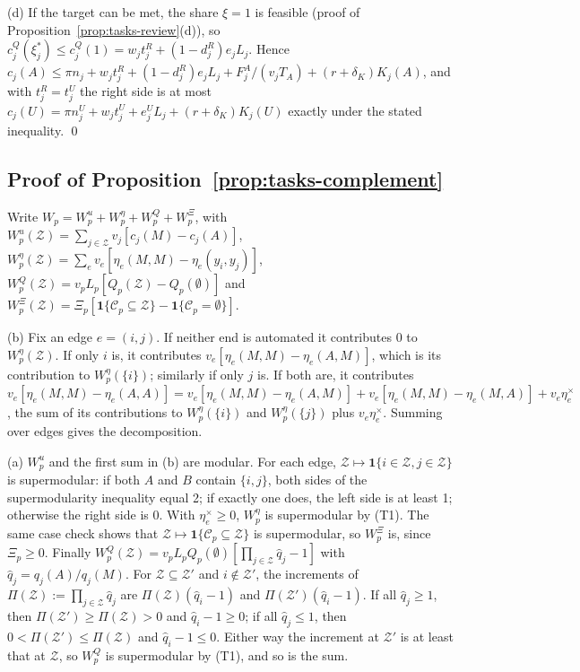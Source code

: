 (d) If the target can be met, the share $\xi=1$ is feasible (proof of Proposition~\ref{prop:tasks-review}(d)), so $c^Q_j(\xi^*_j)\le c^Q_j(1)=w_jt^R_j+(1-d^R_j)e_jL_j$. Hence $c_j(A)\le\pi n_j+w_jt^R_j+(1-d^R_j)e_jL_j+F^A_j/(v_jT_A)+(r+\delta_K)K_j(A)$, and with $t^R_j=t^U_j$ the right side is at most $c_j(U)=\pi n^U_j+w_jt^U_j+e^U_jL_j+(r+\delta_K)K_j(U)$ exactly under the stated inequality. \qed

\subsection*{Proof of Proposition~\ref{prop:tasks-complement}}

Write $W_p=W^u_p+W^\eta_p+W^Q_p+W^\Xi_p$, with $W^u_p(\mathcal Z)=\sum_{j\in\mathcal Z}v_j[c_j(M)-c_j(A)]$, $W^\eta_p(\mathcal Z)=\sum_ev_e[\eta_e(M,M)-\eta_e(y_i,y_j)]$, $W^Q_p(\mathcal Z)=v_pL_p[Q_p(\mathcal Z)-Q_p(\emptyset)]$ and $W^\Xi_p(\mathcal Z)=\Xi_p[\mathbf 1\{\mathcal C_p\subseteq\mathcal Z\}-\mathbf 1\{\mathcal C_p=\emptyset\}]$.

(b) Fix an edge $e=(i,j)$. If neither end is automated it contributes $0$ to $W^\eta_p(\mathcal Z)$. If only $i$ is, it contributes $v_e[\eta_e(M,M)-\eta_e(A,M)]$, which is its contribution to $W^\eta_p(\{i\})$; similarly if only $j$ is. If both are, it contributes $v_e[\eta_e(M,M)-\eta_e(A,A)]=v_e[\eta_e(M,M)-\eta_e(A,M)]+v_e[\eta_e(M,M)-\eta_e(M,A)]+v_e\eta^\times_e$, the sum of its contributions to $W^\eta_p(\{i\})$ and $W^\eta_p(\{j\})$ plus $v_e\eta^\times_e$. Summing over edges gives the decomposition.

(a) $W^u_p$ and the first sum in (b) are modular. For each edge, $\mathcal Z\mapsto\mathbf 1\{i\in\mathcal Z,j\in\mathcal Z\}$ is supermodular: if both $A$ and $B$ contain $\{i,j\}$, both sides of the supermodularity inequality equal 2; if exactly one does, the left side is at least 1; otherwise the right side is 0. With $\eta^\times_e\ge 0$, $W^\eta_p$ is supermodular by (T1). The same case check shows that $\mathcal Z\mapsto\mathbf 1\{\mathcal C_p\subseteq\mathcal Z\}$ is supermodular, so $W^\Xi_p$ is, since $\Xi_p\ge 0$. Finally $W^Q_p(\mathcal Z)=v_pL_pQ_p(\emptyset)[\prod_{j\in\mathcal Z}\hat q_j-1]$ with $\hat q_j=q_j(A)/q_j(M)$. For $\mathcal Z\subseteq\mathcal Z'$ and $i\notin\mathcal Z'$, the increments of $\Pi(\mathcal Z):=\prod_{j\in\mathcal Z}\hat q_j$ are $\Pi(\mathcal Z)(\hat q_i-1)$ and $\Pi(\mathcal Z')(\hat q_i-1)$. If all $\hat q_j\ge 1$, then $\Pi(\mathcal Z')\ge\Pi(\mathcal Z)>0$ and $\hat q_i-1\ge 0$; if all $\hat q_j\le 1$, then $0<\Pi(\mathcal Z')\le\Pi(\mathcal Z)$ and $\hat q_i-1\le 0$. Either way the increment at $\mathcal Z'$ is at least that at $\mathcal Z$, so $W^Q_p$ is supermodular by (T1), and so is the sum.

